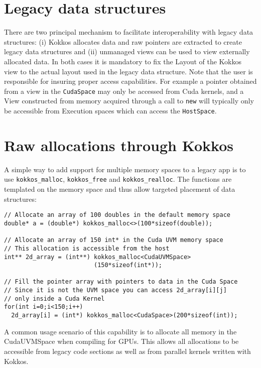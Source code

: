 \section{Legacy data structures}

There are two principal mechanism to facilitate interoperability with legacy data 
structures: (i) Kokkos allocates data and raw pointers are extracted to create 
legacy data structures and (ii) unmanaged views can be used to view externally 
allocated data. In both cases it is mandatory to fix the Layout of the Kokkos view
to the actual layout used in the legacy data structure. Note that the user is responsible
for insuring proper access capabilities. For example a pointer obtained from a view
in the \lstinline|CudaSpace| may only be accessed from Cuda kernels, and a View
constructed from memory acquired through a call to \lstinline|new| will typically only 
be accessible from Execution spaces which can access the \lstinline|HostSpace|.

\section{Raw allocations through Kokkos}

A simple way to add support for multiple memory spaces to a legacy app is to 
use \lstinline|kokkos_malloc|, \lstinline|kokkos_free| and \lstinline|kokkos_realloc|.
The functions are templated on the memory space and thus allow targeted 
placement of data structures: 

\begin{lstlisting}
// Allocate an array of 100 doubles in the default memory space
double* a = (double*) kokkos_malloc<>(100*sizeof(double)); 

// Allocate an array of 150 int* in the Cuda UVM memory space
// This allocation is accessible from the host
int** 2d_array = (int**) kokkos_malloc<CudaUVMSpace>
                         (150*sizeof(int*));

// Fill the pointer array with pointers to data in the Cuda Space
// Since it is not the UVM space you can access 2d_array[i][j] 
// only inside a Cuda Kernel
for(int i=0;i<150;i++)
  2d_array[i] = (int*) kokkos_malloc<CudaSpace>(200*sizeof(int));
\end{lstlisting}

A common usage scenario of this capability is to allocate all memory in the CudaUVMSpace 
when compiling for GPUs. This allows all allocations to be accessible from legacy code sections
as well as from parallel kernels written with Kokkos. 

